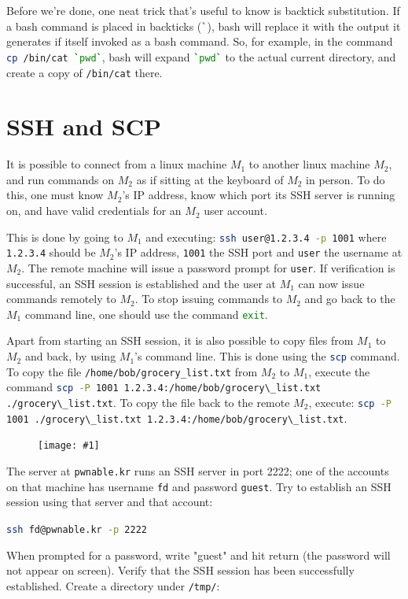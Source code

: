 \documentclass{article}
\newcommand{\wrapimageleft}[1] {
    \begin{figure}
        \begin{center}
            \texttt{[image: \#1]} 
        \end{center}
    \end{figure}
}
\newcommand{\xcode}[2]{\colorbox{ubuntuback}{\lstinline[language=#1]|#2|}}
\newcommand{\code}[1]{\colorbox{ubuntuback}{\texttt{#1}}}
\begin{document}
Before we're done, one neat trick that's useful to know is backtick substitution. If a bash command is placed in backticks (\xcode{bash}{`}), bash will replace it with the output it generates if itself invoked as a bash command. So, for example, in the command \xcode{bash}{cp /bin/cat `pwd`}, bash will expand \xcode{bash}{`pwd`} to the actual current directory, and create a copy of \xcode{bash}{/bin/cat} there.

\section{SSH and SCP}

It is possible to connect from a linux machine $M_1$ to another linux machine $M_2$, and run commands on $M_2$ as if sitting at the keyboard of $M_2$ in person. To do this, one must know $M_2$'s IP address, know which port its SSH server is running on, and have valid credentials for an $M_2$ user account.

This is done by going to $M_1$ and executing: \xcode{bash}{ssh user@1.2.3.4 -p 1001} where \code{1.2.3.4} should be $M_2$'s IP address, \code{1001} the SSH port and \code{user} the username at $M_2$. The remote machine will issue a password prompt for \code{user}. If verification is successful, an SSH session is established and the user at $M_1$ can now issue commands remotely to $M_2$. To stop issuing commands to $M_2$ and go back to the $M_1$ command line, one should use the command \xcode{bash}{exit}.

Apart from starting an SSH session, it is also possible to copy files from $M_1$ to $M_2$ and back, by using $M_1$'s command line. This is done using the \xcode{bash}{scp} command. To copy the file \code{/home/bob/grocery\_list.txt} from $M_2$ to $M_1$, execute the command \xcode{bash}{scp -P 1001 1.2.3.4:/home/bob/grocery\_list.txt ./grocery\_list.txt}. To copy the file back to the remote $M_2$, execute: \xcode{bash}{scp -P 1001 ./grocery\_list.txt 1.2.3.4:/home/bob/grocery\_list.txt}.

\wrapimageleft{./images/ssh.png}
The server at \code{pwnable.kr} runs an SSH server in port 2222; one of the accounts on that machine has username \code{fd} and password \code{guest}. Try to establish an SSH session using that server and that account:

\xcode{bash}{ssh fd@pwnable.kr -p 2222}

When prompted for a password, write "guest" and hit return (the password will not appear on screen).  Verify that the SSH session has been successfully established. Create a directory under \code{/tmp/}:
\end{document}
